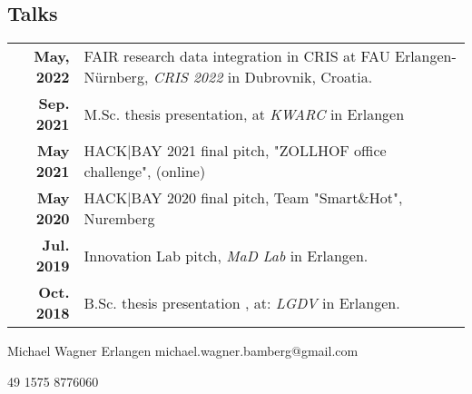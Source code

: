 \documentclass[michiscolours]{hipstercv}
\newlength{\rightcolwidth}
\begin{document}
\begin{paracol}{2}
\begin{minipage}[t]{0.3\textwidth}
\section*{Talks}
\begin{tabular}{>{\footnotesize\bfseries}r >{\footnotesize}p{}}
   May, 2022& FAIR research data integration in CRIS at FAU Erlangen-Nürnberg, \emph{CRIS 2022} in Dubrovnik, Croatia. \\
    Sep. 2021& M.Sc. thesis presentation, at \emph{KWARC} in Erlangen \\
    May 2021& HACK|BAY 2021 final pitch, "ZOLLHOF office challenge",  (online) \\
    May 2020& HACK|BAY 2020 final pitch, Team "Smart\&Hot", Nuremberg \\
    Jul. 2019& Innovation Lab pitch, \emph{MaD Lab} in Erlangen.\\
    Oct. 2018& B.Sc. thesis presentation , at: \emph{LGDV} in Erlangen. \\
\end{tabular}
\end{minipage}


\vfill{} %
\setlength{\parindent}{0pt}
\begin{minipage}[t]{\rightcolwidth}
\begin{center}\fontfamily{\sfdefault}\selectfont \color{black!70}
{
\small Michael Wagner 
 Erlangen 
 michael.wagner.bamberg@gmail.com \newline 

 49 1575 8776060 
}
\end{center}
\end{minipage}

\newpage

\end{paracol}
\end{document}
